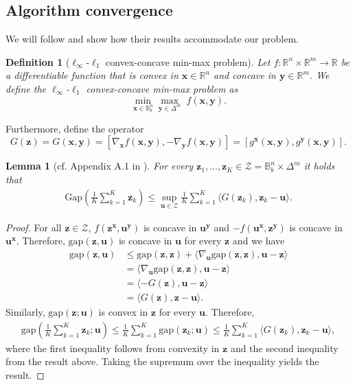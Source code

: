 \documentclass[10pt]{article} %
\newtheorem{lemma}{Lemma}
\newtheorem{definition}{Definition}
\def\vu{{\bm{u}}}
\def\vx{{\bm{x}}}
\def\vy{{\bm{y}}}
\def\vz{{\bm{z}}}
\def\sB{{\mathbb{B}}}
\newcommand{\R}{\mathbb{R}}
\begin{document}
\subsection{Algorithm convergence}
We will follow \cite{Jin2020} and show how their results accommodate our problem.
\begin{definition}[$\ell_\infty$-$\ell_1$ convex-concave min-max problem] 
    Let \(f: \R^n \times \R^m \to \R\) be a differentiable function that is convex in \(\vx\in\R^n\) and concave in \(\vy\in\R^m\). We define the \(\ell_\infty\)-\(\ell_1\) convex-concave min-max problem as
\begin{equation}\label{eq:convconc}
    \min_{\vx \in \sB^n_b} \max_{\vy \in \Delta^m} \; f(\vx, \vy).
\end{equation}
\end{definition}

Furthermore, define the operator $$G(\vz)=G(\vx,\vy)=[\nabla_\vx f(\vx,\vy), - \nabla_\vy f(\vx,\vy)]= [g^\vx(\vx,\vy), g^\vy(\vx,\vy)].$$

\begin{lemma}[cf. Appendix A.1 in \cite{Carmon2019}] \label{lemma:Gap}
For every $\vz_1,...,\vz_K \in \mathcal{Z} = \sB^n_b \times \Delta^m$ it holds that
\begin{align*}
    \text{Gap}\left(\frac{1}{K}\sum\limits_{k=1}^K \vz_k\right) \leq \sup_{\vu\in\mathcal{Z}} \frac{1}{K}\sum\limits_{k=1}^K \langle G(\vz_k), \vz_k - \vu\rangle.
\end{align*}
\end{lemma}
\begin{proof}
    For all $\vz\in\mathcal{Z}$, $f(\vz^\vx, \vu^\vy)$ is concave in $\vu^\vy$ and $-f(\vu^\vx,\vz^\vy)$ is concave in $\vu^\vx$. Therefore, $\text{gap}(\vz,\vu)$ is concave in $\vu$ for every $\vz$ and we have
    \begin{align*}
        \text{gap}(\vz,\vu) &\leq \text{gap}(\vz,\vz) + \langle \nabla_\vu\text{gap}(\vz,\vz), \vu-\vz \rangle\\
        &= \langle \nabla_\vu\text{gap}(\vz,\vz), \vu-\vz \rangle\\
        &= \langle -G(\vz), \vu-\vz \rangle\\
        &= \langle G(\vz), \vz-\vu \rangle.
    \end{align*}
    Similarly, $\text{gap}(\vz;\vu)$ is convex in $\vz$ for every $\vu$. Therefore,
    \begin{align*}
        \text{gap}\left(\frac{1}{K}\sum\limits_{k=1}^K \vz_k;\vu \right) \leq \frac{1}{K}\sum\limits_{k=1}^K\text{gap}(\vz_k;\vu) \leq \frac{1}{K}\sum\limits_{k=1}^K \langle G(\vz_k), \vz_k - \vu \rangle,
    \end{align*}
    where the first inequality follows from convexity in $\vz$ and the second inequality from the result above. Taking the supremum over the inequality yields the result.
\end{proof}
\end{document}
